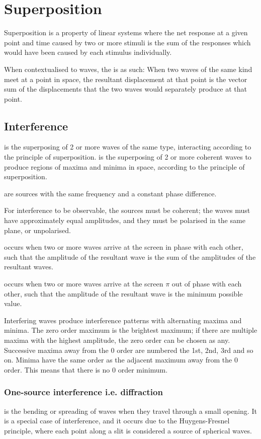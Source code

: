 \documentclass[Physics.tex]{subfiles}
\begin{document}
\chapter{Superposition}
Superposition is a property of linear systems where the net response at a given point and time caused by two or more stimuli is the sum of the responses which would have been caused by each stimulus individually.

When contextualised to waves, the  is as such: When two waves of the same kind meet at a point in space, the resultant displacement at that point is the vector sum of the displacements that the two waves would separately produce at that point.
\section{Interference}
 is the superposing of 2 or more waves of the same type, interacting according to the principle of superposition.  is the superposing of 2 or more coherent waves to produce regions of maxima and minima in space, according to the principle of superposition.

 are sources with the same frequency and a constant phase difference.

For interference to be observable, the sources must be coherent; the waves must have approximately equal amplitudes, and they must be polarised in the same plane, or unpolarised.

 occurs when two or more waves arrive at the screen in phase with each other, such that the amplitude of the resultant wave is the sum of the amplitudes of the resultant waves.

 occurs when two or more waves arrive at the screen \(\pi\) out of phase with each other, such that the amplitude of the resultant wave is the minimum possible value.

Interfering waves produce interference patterns with alternating maxima and minima. The zero order maximum is the brightest maximum; if there are multiple maxima with the highest amplitude, the zero order can be chosen as any. Successive maxima away from the 0 order are numbered the 1st, 2nd, 3rd and so on. Minima have the same order as the adjacent maximum away from the 0 order. This means that there is no 0 order minimum.
\subsection{One-source interference i.e. diffraction}
 is the bending or spreading of waves when they travel through a small opening. It is a special case of interference, and it occurs due to the Huygens-Fresnel principle, where each point along a slit is considered a source of spherical waves.
\end{document}
